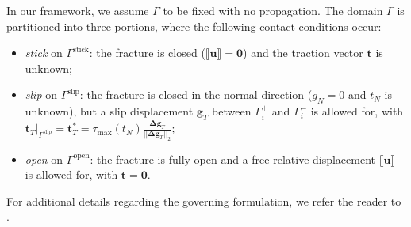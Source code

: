 \documentclass[3p,times]{elsarticle}
\theoremstyle{plain}
\renewcommand{\vec}[1]{\boldsymbol{#1}}
\begin{document}
In our framework, we assume $\Gamma$ to be fixed with no propagation. The domain $\Gamma$ is
partitioned into three portions, where the following contact conditions occur:
\begin{itemize}
  \item \textit{stick} on $\Gamma^{\text{stick}}$: the fracture is closed
    ($\llbracket \vec{u} \rrbracket = \vec{0}$) and the traction vector $\vec{t}$ is unknown;
  \item \textit{slip} on $\Gamma^{\text{slip}}$: the fracture is closed in the
    normal direction ($g_N=0$ and $t_N$ is unknown), but a slip displacement $\vec{g}_T$ between
    $\Gamma_i^+$ and $\Gamma_i^-$ is allowed for, with $\vec{t}_T\vert_{\Gamma^{\text{slip}}} =
    \vec{t}_T^\ast = \tau_{\text{max}}(t_N) \frac{\vec{\Delta g}_T}{||\vec{\Delta g}_T||_2}$;
  \item \textit{open} on $\Gamma^{\text{open}}$: the fracture is fully open and a
    free relative displacement $\llbracket \vec{u} \rrbracket$ is allowed for, with $\vec{t}=\vec{0}$.
\end{itemize}
For additional details regarding the governing formulation, we refer the reader to
\cite{KikOde88,Lau03,Wri06,fr2020alg}.
\end{document}
